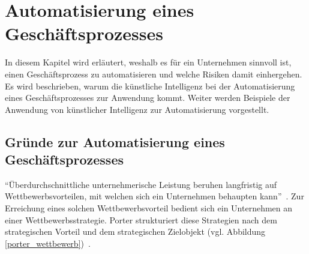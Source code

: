 \section{Automatisierung eines Geschäftsprozesses}
\label{chap:automation}

In diesem Kapitel wird erläutert, weshalb es für ein Unternehmen sinnvoll ist, einen Geschäftsprozess zu automatisieren und welche Risiken damit einhergehen. Es wird beschrieben, warum die künstliche Intelligenz bei der Automatisierung eines Geschäftsprozesses zur Anwendung kommt. Weiter werden Beispiele der Anwendung von künstlicher Intelligenz zur Automatisierung vorgestellt.

\subsection{Gründe zur Automatisierung eines Geschäftsprozesses}

\enquote{Überdurchschnittliche unternehmerische Leistung beruhen langfristig auf Wettbewerbsvorteilen, mit welchen sich ein Unternehmen behaupten kann}~\autocite[104]{Capaul2010}. Zur Erreichung eines solchen Wettbewerbsvorteil bedient sich ein Unternehmen an einer Wettbewerbsstrategie. Porter strukturiert diese Strategien nach dem strategischen Vorteil und dem strategischen Zielobjekt (vgl. Abbildung \ref{porter_wettbewerb})~\autocite{Capaul2010}. 


